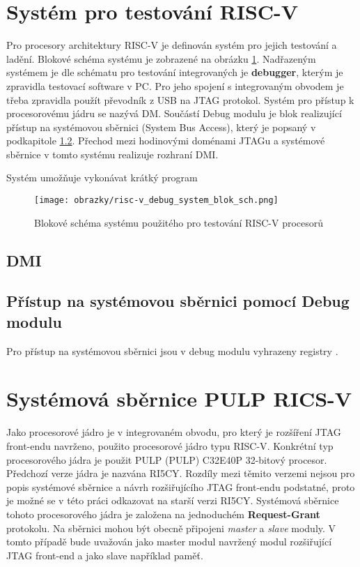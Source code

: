 \section{Systém pro testování \acs{RISC-V}}		\label{sec:risc-v_dbg}
Pro procesory architektury \acs{RISC-V} je definován systém pro jejich testování a ladění. Blokové schéma systému je zobrazené na obrázku \ref{fig:blok_sch_risc-v_dbg}. Nadřazeným systémem je dle schématu pro testování integrovaných je \textbf{debugger}, kterým je zpravidla testovací software v PC. Pro jeho spojení s integrovaným obvodem je třeba zpravidla použít převodník z USB na JTAG protokol. Systém pro přístup k procesorovému jádru se nazývá \ac{DM}. Součástí Debug modulu je blok realizující přístup na systémovou sběrnici (System Bus Access), který je popsaný v podkapitole \ref{subsec:dm_sba}. Přechod mezi hodinovými doménami \acs{JTAG}u a systémové sběrnice v tomto systému realizuje rozhraní \ac{DMI}. \cite{risc-v_dbg}


Systém umožňuje vykonávat krátký program 

\begin{figure}[!h]
  \begin{center}
    \texttt{[image: obrazky/risc-v\_debug\_system\_blok\_sch.png]}
  \end{center}
  \caption{Blokové schéma systému použitého pro testování \acs{RISC-V} procesorů \cite{risc-v_dbg}}
	\label{fig:blok_sch_risc-v_dbg}
\end{figure}

\subsection{\acs{DMI}}		\label{subsec:dmi}

\subsection{Přístup na systémovou sběrnici pomocí Debug modulu}		\label{subsec:dm_sba}
Pro přístup	na systémovou sběrnici jsou v debug modulu vyhrazeny registry 			. \cite{risc-v_dbg}

\section{Systémová sběrnice PULP RICS-V}
Jako procesorové jádro je v integrovaném obvodu, pro který je rozšíření JTAG front-endu navrženo, použito procesorové jádro typu \acs{RISC-V}. Konkrétní typ procesorového jádra je použit \acs{PULP} (\acl{PULP}) C32E40P 32-bitový procesor. Předchozí verze jádra je nazvána RI5CY. Rozdíly mezi těmito verzemi nejsou pro popis systémové sběrnice a návrh rozšiřujícího JTAG front-endu podstatné, proto je možné se v této práci odkazovat na starší verzi RI5CY. Systémová sběrnice tohoto procesorového jádra je založena na jednoduchém \textbf{Request-Grant} protokolu. Na sběrnici mohou být obecně připojeni \textit{master} a \textit{slave} moduly. V tomto případě bude uvažován jako master modul navržený modul rozšiřující JTAG front-end a jako slave například paměť.

